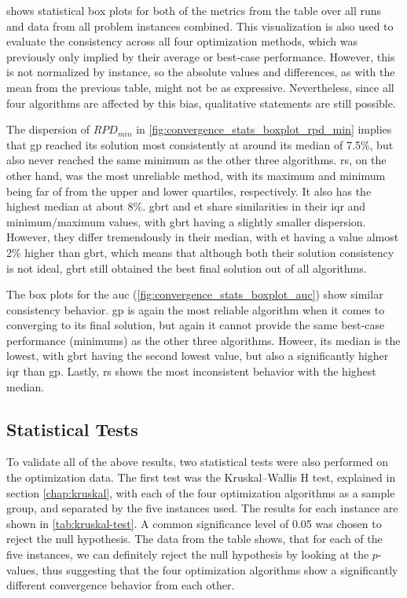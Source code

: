  shows statistical box plots for both of the metrics from the table over all runs and data from all problem instances combined. This visualization is also used to evaluate the consistency across all four optimization methods, which was previously only implied by their average or best-case performance. However, this is not normalized by instance, so the absolute values and differences, as with the mean from the previous table, might not be as expressive. Nevertheless, since all four algorithms are affected by this bias, qualitative statements are still possible.

The dispersion of $RPD_{min}$ in \cref{fig:convergence_stats_boxplot_rpd_min} implies that \gls{gp} reached its solution most consistently at around its median of 7.5\%, but also never reached the same minimum as the other three algorithms. \gls{rs}, on the other hand, was the most unreliable method, with its maximum and minimum being far of from the upper and lower quartiles, respectively. It also has the highest median at about 8\%. \gls{gbrt} and \gls{et} share similarities in their \gls{iqr} and minimum/maximum values, with \gls{gbrt} having a slightly smaller dispersion. However, they differ tremendously in their median, with \gls{et} having a value almost 2\% higher than \gls{gbrt}, which means that although both their solution consistency is not ideal, \gls{gbrt} still obtained the best final solution out of all algorithms.

The box plots for the \gls{auc} (\cref{fig:convergence_stats_boxplot_auc}) show similar consistency behavior. \gls{gp} is again the most reliable algorithm when it comes to converging to its final solution, but again it cannot provide the same best-case performance (minimums) as the other three algorithms. Howeer, its median is the lowest, with \gls{gbrt} having the second lowest value, but also a significantly higher \gls{iqr} than \gls{gp}. Lastly, \gls{rs} shows the most inconsistent behavior with the highest median. 

\subsection{Statistical Tests}

To validate all of the above results, two statistical tests were also performed on the optimization data. The first test was the Kruskal–Wallis H test, explained in section \cref{chap:kruskal}, with each of the four optimization algorithms as a sample group, and separated by the five instances used. The results for each instance are shown in \cref{tab:kruskal-test}. A common significance level of 0.05 was chosen to reject the null hypothesis. The data from the table shows, that for each of the five instances, we can definitely reject the null hypothesis by looking at the $p$-values, thus suggesting that the four optimization algorithms show a significantly different convergence behavior from each other. 

